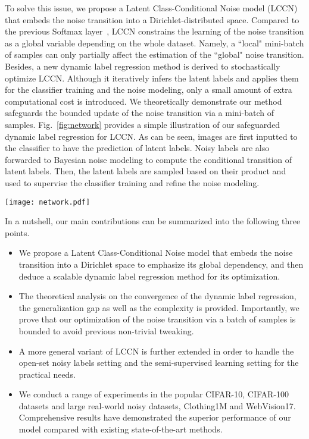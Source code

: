 \documentclass[journal]{IEEEtran}
\begin{document}
To solve this issue, we propose a Latent Class-Conditional Noise model (LCCN) that embeds the noise transition into a Dirichlet-distributed space. Compared to the previous Softmax layer~\cite{goldberger2016training}, LCCN constrains the learning of the noise transition as a global variable depending on the whole dataset. Namely, a ``local" mini-batch of samples can only partially affect the estimation of the ``global" noise transition. Besides, a new dynamic label regression method is derived to stochastically optimize LCCN. Although it iteratively infers the latent labels and applies them for the classifier training and the noise modeling, only a small amount of extra computational cost is introduced. We theoretically demonstrate our method safeguards the bounded update of the noise transition via a mini-batch of samples. Fig.~\ref{fig:network} provides a simple illustration of our safeguarded dynamic label regression for LCCN. As can be seen, images are first inputted to the classifier to have the prediction of latent labels. Noisy labels are also forwarded to Bayesian noise modeling to compute the conditional transition of latent labels. Then, the latent labels are sampled based on their product and used to supervise the classifier training and refine the noise modeling. 
\begin{figure*} 
\centering
\texttt{[image: network.pdf]}
\caption{Safeguarded dynamic label regression for LCCN. The images and noisy labels are respectively inputted to the classifier and the safeguarded Bayesian noise modeling to compute the prediction and the conditional transition. Then, the latent labels are sampled based on their product and then used for the classifier training and the safeguarded Bayesian noise modeling.}\label{fig:network}
\end{figure*}
In a nutshell, our main contributions can be summarized into the following three points.
\begin{itemize}
\item We propose a Latent Class-Conditional Noise model that embeds the noise transition into a Dirichlet space to emphasize its global dependency, and then deduce a scalable dynamic label regression method for its optimization.
\item The theoretical analysis on the convergence of the dynamic label regression, the generalization gap as well as the complexity is provided. Importantly, we prove that our optimization of the noise transition via a batch of samples is bounded to avoid previous non-trivial tweaking.
\item A more general variant of LCCN is further extended in order to handle the open-set noisy labels setting and the semi-supervised learning setting for the practical needs.
\item We conduct a range of experiments in the popular CIFAR-10, CIFAR-100 datasets and large real-world noisy datasets, Clothing1M and WebVision17. Comprehensive results have demonstrated the superior performance of our model compared with existing state-of-the-art methods.
\end{itemize}
\end{document}
